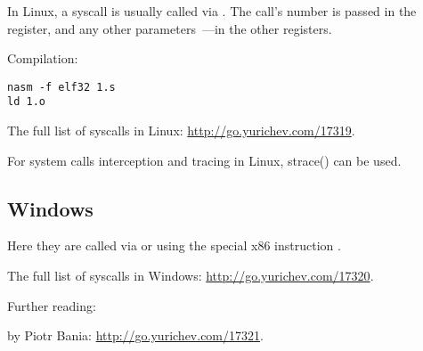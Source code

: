 In Linux, a syscall is usually called via .
The call's number is passed in the \EAX register, and any other parameters~---in the other registers.



Compilation:

\begin{lstlisting}
nasm -f elf32 1.s
ld 1.o
\end{lstlisting}

The full list of syscalls in Linux: \url{http://go.yurichev.com/17319}.

For system calls interception and tracing in Linux, strace() can be used.

\subsection{Windows}


Here they are called via  
or using the special x86 instruction .

The full list of syscalls in Windows: \url{http://go.yurichev.com/17320}.

Further reading:

 by Piotr Bania: \url{http://go.yurichev.com/17321}.

